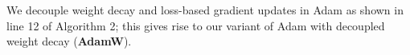 \documentclass[usenames,dvipsnames]{article} %
\newcommand{\note}[1]{
	\noindent~\\
	\vspace{0.25cm}
	\fcolorbox{red}{yellow}{\parbox{0.97\textwidth}{#1\\}}
	\vspace{0.25cm}
}
\begin{document}

We decouple weight decay and loss-based gradient updates in Adam as shown in line 12 of Algorithm 2; this gives rise to our variant of Adam with decoupled weight decay (\textbf{AdamW}). %

\end{document}
